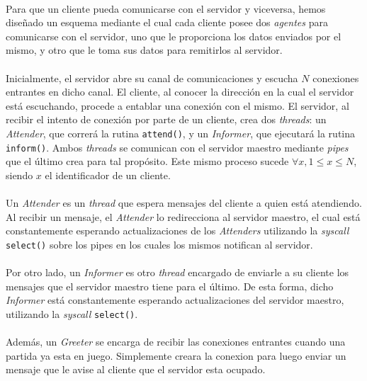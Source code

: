 \documentclass[spanish]{article}
\begin{document}
\paragraph{} Para que un cliente pueda comunicarse con el servidor y viceversa, hemos diseñado un esquema mediante el cual cada cliente posee dos \textit{agentes} para comunicarse con el servidor, uno que le proporciona los datos enviados por el mismo, y otro que le toma sus datos para remitirlos al servidor. 
\paragraph{} Inicialmente, el servidor abre su canal de comunicaciones y escucha $N$ conexiones entrantes en dicho canal. El cliente, al conocer la dirección en la cual el servidor está escuchando, procede a entablar una conexión con el mismo. El servidor, al recibir el intento de conexión por parte de un cliente, crea dos \textit{threads}: un \textit{Attender}, que correrá la rutina \verb|attend()|, y un \textit{Informer}, que ejecutará la rutina \verb|inform()|. Ambos \textit{threads} se comunican con el servidor maestro mediante \textit{pipes} que el último crea para tal propósito. Este mismo proceso sucede $\forall x,1 \leq x \leq N$, siendo $x$ el identificador de un cliente.
\paragraph{} Un \textit{Attender} es un \textit{thread} que espera mensajes del cliente a quien está atendiendo. Al recibir un mensaje, el \textit{Attender} lo redirecciona al servidor maestro, el cual está constantemente esperando actualizaciones de los \textit{Attenders} utilizando la \textit{syscall} \verb|select()| sobre los pipes en los cuales los mismos notifican al servidor. 
\paragraph{} Por otro lado, un \textit{Informer} es otro \textit{thread} encargado de enviarle a su cliente los mensajes que el servidor maestro tiene para el último. De esta forma, dicho \textit{Informer} está constantemente esperando actualizaciones del servidor maestro, utilizando la \textit{syscall} \verb|select()|. 
\paragraph{} Además, un \textit{Greeter} se encarga de recibir las conexiones entrantes cuando una partida ya esta en juego. Simplemente creara la conexion para luego enviar un mensaje que le avise al cliente que el servidor esta ocupado. 
\end{document}
